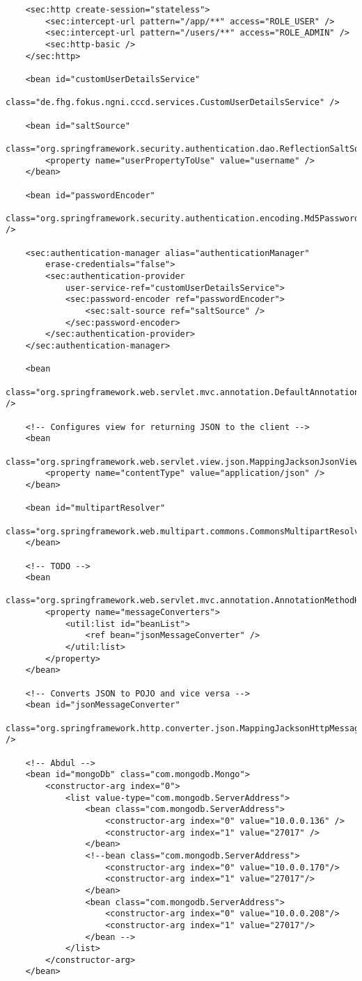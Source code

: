 \begin{appendix}
\begin{code}
\begin{verbatim}
	<sec:http create-session="stateless">
		<sec:intercept-url pattern="/app/**" access="ROLE_USER" />
		<sec:intercept-url pattern="/users/**" access="ROLE_ADMIN" />
		<sec:http-basic />
	</sec:http>

	<bean id="customUserDetailsService"
		class="de.fhg.fokus.ngni.cccd.services.CustomUserDetailsService" />

	<bean id="saltSource"
		class="org.springframework.security.authentication.dao.ReflectionSaltSource">
		<property name="userPropertyToUse" value="username" />
	</bean>

	<bean id="passwordEncoder"
		class="org.springframework.security.authentication.encoding.Md5PasswordEncoder" />

	<sec:authentication-manager alias="authenticationManager"
		erase-credentials="false">
		<sec:authentication-provider
			user-service-ref="customUserDetailsService">
			<sec:password-encoder ref="passwordEncoder">
				<sec:salt-source ref="saltSource" />
			</sec:password-encoder>
		</sec:authentication-provider>
	</sec:authentication-manager>

	<bean
		class="org.springframework.web.servlet.mvc.annotation.DefaultAnnotationHandlerMapping" />

	<!-- Configures view for returning JSON to the client -->
	<bean
		class="org.springframework.web.servlet.view.json.MappingJacksonJsonView">
		<property name="contentType" value="application/json" />
	</bean>

	<bean id="multipartResolver"
		class="org.springframework.web.multipart.commons.CommonsMultipartResolver">
	</bean>

	<!-- TODO -->
	<bean
		class="org.springframework.web.servlet.mvc.annotation.AnnotationMethodHandlerAdapter">
		<property name="messageConverters">
			<util:list id="beanList">
				<ref bean="jsonMessageConverter" />
			</util:list>
		</property>
	</bean>

	<!-- Converts JSON to POJO and vice versa -->
	<bean id="jsonMessageConverter"
		class="org.springframework.http.converter.json.MappingJacksonHttpMessageConverter" />

	<!-- Abdul -->
	<bean id="mongoDb" class="com.mongodb.Mongo">
		<constructor-arg index="0">
			<list value-type="com.mongodb.ServerAddress">
				<bean class="com.mongodb.ServerAddress">
					<constructor-arg index="0" value="10.0.0.136" />
					<constructor-arg index="1" value="27017" />
				</bean>
				<!--bean class="com.mongodb.ServerAddress"> 
					<constructor-arg index="0" value="10.0.0.170"/> 
					<constructor-arg index="1" value="27017"/> 
				</bean> 
				<bean class="com.mongodb.ServerAddress"> 
					<constructor-arg index="0" value="10.0.0.208"/> 
					<constructor-arg index="1" value="27017"/> 
				</bean -->
			</list>
		</constructor-arg>
	</bean>


\end{verbatim}
\end{code}
\end{appendix}
